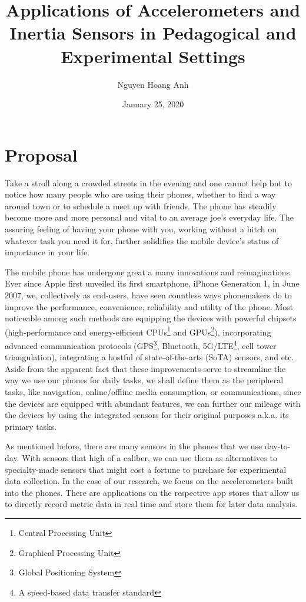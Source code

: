 \documentclass{article}
\author{Nguyen Hoang Anh}
\date{January 25, 2020}
\title{Applications of Accelerometers and Inertia Sensors in Pedagogical and Experimental Settings}
\begin{document}
    \maketitle

    \section*{Proposal}
    Take a stroll along a crowded streets in the evening and one cannot help but to notice how many people who are using their phones, whether to find a way around town or to schedule a meet up with friends. The phone has steadily become more and more personal and vital to an average joe's everyday life. The assuring feeling of having your phone with you, working without a hitch on whatever task you need it for, further solidifies the mobile device's status of importance in your life.

    The mobile phone has undergone great a many innovations and reimaginations. Ever since Apple first unveiled its first smartphone, iPhone Generation 1, in June 2007, we, collectively as end-users, have seen countless ways phonemakers do to improve the performance, convenience, reliability and utility of the phone. Most noticeable among such methods are equipping the devices with powerful chipsets (high-performance and energy-efficient CPUs\footnote{Central Processing Unit} and GPUs\footnote{Graphical Processing Unit}), incorporating advanced communication protocols (GPS\footnote{Global Positioning System}, Bluetooth, 5G/LTE\footnote{A speed-based data transfer standard}, cell tower triangulation), integrating a hostful of state-of-the-arts (SoTA) sensors, and etc. Aside from the apparent fact that these improvements serve to streamline the way we use our phones for daily tasks, we shall define them as the peripheral tasks, like navigation, online/offline media consumption, or communications, since the devices are equipped with abundant features, we can further our mileage with the devices by using the integrated sensors for their original purposes a.k.a. its primary tasks.

    As mentioned before, there are many sensors in the phones that we use day-to-day. With sensors that high of a caliber, we can use them as alternatives to specialty-made sensors that might cost a fortune to purchase for experimental data collection. In the case of our research, we focus on the accelerometers built into the phones. There are applications on the respective app stores that allow us to directly record metric data in real time and store them for later data analysis.
\end{document}
